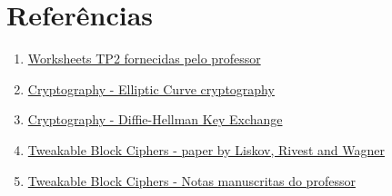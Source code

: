 \documentclass[11pt]{article}
\providecommand{\tightlist}{%
      \setlength{\itemsep}{0pt}\setlength{\parskip}{0pt}}
\begin{document}
    \hypertarget{referuxeancias}{%
\section{Referências}\label{referuxeancias}}

    \begin{enumerate}
\def\labelenumi{\arabic{enumi}.}
\tightlist
\item
  \href{https://www.dropbox.com/sh/f0j9adiaw4v3deb/AADIuhV5bL5qqzbM_RLS-gMXa/WorkSheets/TP2?dl=0\&subfolder_nav_tracking=1}{Worksheets
  TP2 fornecidas pelo professor}
\item
  \href{https://cryptography.io/en/latest/hazmat/primitives/asymmetric/ec/\#}{Cryptography
  - Elliptic Curve cryptography}
\item
  \href{https://cryptography.io/en/latest/hazmat/primitives/asymmetric/dh/}{Cryptography
  - Diffie-Hellman Key Exchange}
\item
  \href{https://people.eecs.berkeley.edu/~daw/papers/tweak-crypto02.pdf}{Tweakable
  Block Ciphers - paper by Liskov, Rivest and Wagner}
\item
  \href{https://www.dropbox.com/sh/f0j9adiaw4v3deb/AAC5XUPllha9QXo-vVxTHqXna/Docs/NOTAS_MANUSCRITAS?dl=0\&preview=TWEAKABLE_BLOCK_CIPHERS.PDF\&subfolder_nav_tracking=1}{Tweakable
  Block Ciphers - Notas manuscritas do professor}
\end{enumerate}


    
    
    
    
\end{document}
